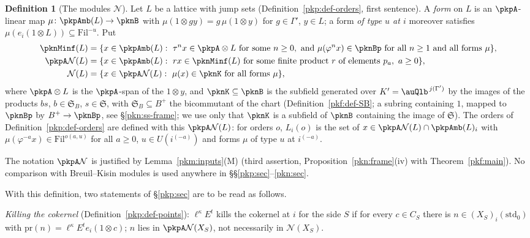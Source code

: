 \documentclass[10pt]{amsart}
\theoremstyle{definition}
\newtheorem{definition}[theorem]{Definition}
\theoremstyle{remark}
\begin{document}
\begin{definition}[The modules $\mathcal N$]\label{pkn:def-N}
Let $L$ be a lattice with jump sets (Definition~\ref{pkp:def-orders}, first sentence). A
\emph{form} on $L$ is an $\pkpA$-linear map $\mu\colon\pkpAmb(L)\to\pknB$ with $\mu(1\otimes gy)=
g\,\mu(1\otimes y)$ for $g\in\Gamma'$, $y\in L$; a form \emph{of type $u$ at $i$} moreover satisfies
$\mu(e_i(1\otimes L))\subseteq\mathrm{Fil}^{-u}$. Put
\begin{align*}
\pknMinf(L)&=\{x\in\pkpAmb(L):\ \tau^nx\in\pkpA\otimes L\text{ for some }n\ge0,\ \text{and }
\mu(\varphi^{n}x)\in\pknBp\text{ for all }n\ge1\text{ and all forms }\mu\},\\
\pkpA\mathcal N(L)&=\{x\in\pkpAmb(L):\ rx\in\pknMinf(L)\text{ for some finite product }r\text{ of
elements }p_a,\ a\ge0\},\\
\mathcal N(L)&=\{x\in\pkpA\mathcal N(L):\ \mu(x)\in\pknK\text{ for all forms }\mu\},
\end{align*}
where $\pkpA\otimes L$ is the $\pkpA$-span of the $1\otimes y$, and $\pknK\subseteq\pknB$ is the
subfield generated over $K'=\auQlb^{\,j(\Gamma')}$ by the images of the products $bs$, $b\in\mathfrak
S_B$, $s\in\mathfrak S$, with $\mathfrak S_B\subseteq B^+$ the bicommutant of the chart (Definition~\ref{pkf:def-SB}; a subring
containing $1$, mapped to $\pknBp$ by $B^+\to\pknBp$, see \S\ref{pkn:ss-frame}; we use only that $\pknK$ is a subfield of $\pknB$ containing the image of $\mathfrak
S$). The orders of Definition~\ref{pkp:def-orders} are defined with this $\pkpA\mathcal N(L)$: for
orders $o$, $L_i(o)$ is the set of $x\in\pkpA\mathcal N(L)\cap\pkpAmb(L)_i$ with $\mu(\varphi^{-a}x)\in
\mathrm{Fil}^{o(a,u)}$ for all $a\ge0$, $u\in U(i^{(-a)})$ and forms $\mu$ of type $u$ at $i^{(-a)}$.
\end{definition}

The notation $\pkpA\mathcal N$ is justified by Lemma~\ref{pkm:inputs}(M) (third assertion, Proposition~\ref{pkn:frame}(iv) with
Theorem~\ref{pkf:main}). No comparison with Breuil--Kisin modules is used anywhere in
\S\S\ref{pkp:sec}--\ref{pkn:sec}.

With this definition, two statements of \S\ref{pkp:sec} are to be read as follows.

\emph{Killing the cokernel} (Definition~\ref{pkp:def-points}): $\ell^\kappa E^t$ kills the cokernel
at $i$ for the side $S$ if for every $c\in C_S$ there is $n\in(X_S)_i(\mathrm{std}_0)$ with
$\mathrm{pr}(n)=\ell^\kappa E^te_i(1\otimes c)$; $n$ lies in $\pkpA\mathcal N(X_S)$, not necessarily in
$\mathcal N(X_S)$.
\end{document}
